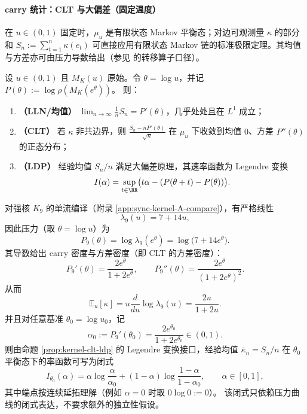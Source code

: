 \paragraph{carry 统计：CLT 与大偏差（固定温度）}
在 $u\in(0,1)$ 固定时，$\mu_u$ 是有限状态 Markov 平衡态；对边可观测量 $\kappa$ 的部分和
\(
S_n:=\sum_{t=1}^{n}\kappa(e_t)
\)
可直接应用有限状态 Markov 链的标准极限定理。其均值与方差亦可由压力导数给出（参见 \cite{Ruelle1978Thermodynamic} 的转移算子口径）。

\begin{proposition}\label{prop:kernel-clt-ldp}
设 $u\in(0,1)$ 且 $M_K(u)$ 原始。令 $\theta=\log u$，并记
\(
P(\theta):=\log\rho(M_K(e^\theta))
\)。
则：
\begin{enumerate}
  \item \textbf{（LLN/均值）} $\lim_{n\to\infty}\frac{1}{n}S_n=P'(\theta)$，几乎处处且在 $L^1$ 成立；
  \item \textbf{（CLT）} 若 $\kappa$ 非共边界，则
  \(
  \frac{S_n-nP'(\theta)}{\sqrt{n}}
  \)
  在 $\mu_u$ 下收敛到均值 $0$、方差 $P''(\theta)$ 的正态分布；
  \item \textbf{（LDP）} 经验均值 $S_n/n$ 满足大偏差原理，其速率函数为 Legendre 变换
  \[
  I(\alpha)=\sup_{t\in\RR}\bigl(t\alpha-(P(\theta+t)-P(\theta))\bigr).
  \]
\end{enumerate}
\end{proposition}

\begin{corollary}\label{cor:k9-integrable-pressure-ldp}
对强核 \(K_9\) 的单流编译（附录 \ref{app:sync-kernel-A-compare}），有严格线性
$$
\lambda_9(u)=7+14u,
$$
因此压力（取 \(\theta=\log u\)）为
$$
P_9(\theta)=\log\lambda_9(e^\theta)=\log\!\bigl(7+14e^\theta\bigr).
$$
其导数给出 carry 密度与方差密度（即 CLT 的方差密度）：
$$
P_9'(\theta)=\frac{2e^\theta}{1+2e^\theta},\qquad
P_9''(\theta)=\frac{2e^\theta}{(1+2e^\theta)^2}.
$$
从而
$$
\mathbb{E}_{u}[\kappa]=u\frac{d}{du}\log\lambda_9(u)=\frac{2u}{1+2u}.
$$
并且对任意基准 \(\theta_0=\log u_0\)，记
$$
\alpha_0:=P_9'(\theta_0)=\frac{2e^{\theta_0}}{1+2e^{\theta_0}}\in(0,1).
$$
则由命题 \ref{prop:kernel-clt-ldp} 的 Legendre 变换接口，经验均值 \(\bar\kappa_n=S_n/n\) 在 \(\theta_0\) 平衡态下的率函数可写为闭式
$$
I_{\theta_0}(\alpha)
=\alpha\log\frac{\alpha}{\alpha_0}+(1-\alpha)\log\frac{1-\alpha}{1-\alpha_0},
\qquad \alpha\in[0,1],
$$
其中端点按连续延拓理解（例如 \(\alpha=0\) 时取 \(0\log 0:=0\)）。
该闭式只依赖压力曲线的闭式表达，不要求额外的独立性假设。
\end{corollary}

